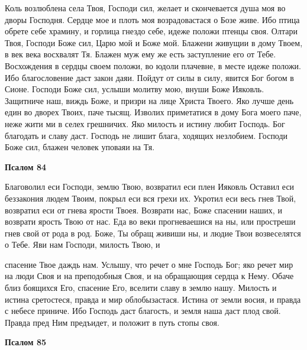    Коль возлюблена села Твоя, Господи сил, желает и скончевается душа
моя во дворы Господня. Сердце мое и плоть моя возрадовастася о Бозе живе.
Ибо птица обрете себе храмину, и горлица гнездо себе, идеже положи птенцы
своя. Олтари Твоя, Господи Боже сил, Царю мой и Боже мой. Блажени
живущии в дому Твоем, в век века восхвалят Тя. Блажен муж ему же есть
заступление его от Тебе. Восхождения в сердцы своем положи, во юдоли
плачевне, в месте идеже положи. Ибо благословение даст закон даяи.
Пойдут от силы в силу, явится Бог богом в Сионе. Господи Боже
сил, услыши молитву мою, внуши Боже Ияковль. Защитниче наш,
виждь Боже, и призри на лице Христа Твоего. Яко лучше день един
во дворех Твоих, паче тысящ. Изволих приметатися в дому Бога
моего паче, неже жити ми в селех грешничих. Яко милость и истину
любит Господь. Бог благодать и славу даст. Господь не лишит блага,
ходящих незлобием. Господи Боже сил, блажен человек уповаяи на
Тя.






 

\bfseries Псалом 84\normalfont{}


   Благоволил еси Господи, землю Твою, возвратил еси плен Ияковль
Оставил еси беззакония людем Твоим, покрыл еси вся грехи их. Укротил еси
весь гнев Твой, возвратил еси от гнева ярости Твоея. Возврати нас, Боже
спасении наших, и возврати ярость Твою от нас. Еда во веки прогневаешися
на ны, или простреши гнев свой от рода в род. Боже, Ты обращ живиши ны,
и людие Твои возвеселятся о Тебе. Яви нам Господи, милость Твою, и

спасение Твое даждь нам. Услышу, что речет о мне Господь Бог; яко речет
мир на люди Своя и на преподобныя Своя, и на обращающия сердца к Нему.
Обаче близ боящихся Его, спасение Его, вселити славу в землю нашу.
Милость и истина сретостеся, правда и мир облобызастася. Истина от земли
восия, и правда с небесе приниче. Ибо Господь даст благость, и земля наша
даст плод свой. Правда пред Ним предъидет, и положит в путь стопы
своя.






 

\bfseries Псалом 85\normalfont{}


